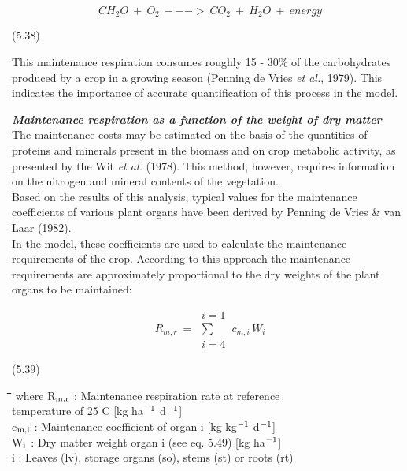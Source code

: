 \begin{displaymath}
CH _{2} O ~+~ O _{2} ~--->~ CO _{2} ~+~ H _{2} O ~+~ energy
\end{displaymath}

 
\strut\hfill (5.38)
 
This maintenance respiration consumes roughly 15 - 30\% of the carbohy\-drates produced
by a crop in a growing season (Penning de Vries {\it et al.\/}, 1979). This indicates the
importance of accurate quantification of this process in the model.


{\bf {\it Maintenance respiration as a function of the weight of dry matter\/}}\\
The maintenance costs may be estimated on the basis of the quantities of proteins and
minerals present in the biomass and on crop metabolic activity, as presented by the Wit {\it et
al.\/} (1978). This method, however, requires information on the nitrogen and mineral
contents of the vegetation.\\
Based on the results of this analysis, typical values for the maintenance coefficients of
various plant organs have been derived by Penning de Vries \& van Laar (1982). \\
In the model, these coefficients are used to calculate the maintenance requirements of the
crop. According to this approach the maintenance requirements are approxi\-mately propor\-tional to the dry weights of the plant organs to be maintained: 

\begin{displaymath}
R _{m,r} ~ = ~\begin{array}{c} {i=1}  \\
\sum  \\
{i=4}\end{array} \, c _{m,i} \, W _{i}
\end{displaymath}


\strut\hfill (5.39)

\nwln
\begin{tabbing}
\hspace{1.27cm}\=\hspace{1.27cm}\=\hspace{1.27cm}\=\hspace{1.27cm}\=%
\hspace{1.27cm}\=\hspace{1.27cm}\=\hspace{1.27cm}\=\hspace{1.27cm}\=%
\hspace{1.27cm}\=\hspace{1.27cm}\=\kill
where R$_{{\rm m,r}}$ : Maintenance respiration rate at reference \\
   temperature of 25 \degrees C        [kg ha$^{{\rm -1}}$ d$^{{\rm -1}}$]\\
c$_{{\rm m,i}}$ : Maintenance coefficient of organ i        [kg kg$^{{\rm -1}}$ d$^{{\rm -1}}$]\\
W$_{{\rm i}}$ : Dry matter weight organ i (see eq. 5.49)        [kg ha$^{{\rm -1}}$]\\
i : Leaves (lv), storage organs (so), stems (st) or roots (rt) 
\end{tabbing}

